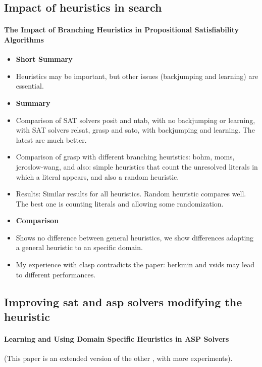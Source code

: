 \subsection{Impact of heuristics in search}	

\paragraph{The Impact of Branching Heuristics in Propositional Satisfiability Algorithms \cite{silva99a}}
\begin{itemize}
 \item \textbf{Short Summary}
  \item Heuristics may be important, but other issues (backjumping and learning) are essential.
 \item \textbf{Summary}
  \item Comparison of SAT solvers posit and ntab, with no backjumping or learning, 
        with SAT solvers relsat, grasp and sato, with backjumping and learning.
        The latest are much better.
  \item Comparison of grasp with different branching heuristics: 
        bohm, moms, jeroslow-wang, and also: simple heuristics that count the unresolved
        literals in which a literal appears, and also a random heuristic.
  \item Results: Similar results for all heuristics. Random heuristic compares well. 
        The best one is counting literals and allowing some randomization.
  \item \textbf{Comparison}
  \item Shows no difference between general heuristics, 
        we show differences adapting a general heuristic to an specific domain.
  \item My experience with clasp contradicts the paper: 
        berkmin and vsids may lead to different performances.      
        
\end{itemize} 

\subsection{Improving sat and asp solvers modifying the heuristic}	

\paragraph{Learning and Using Domain Specific Heuristics in ASP Solvers \cite{balduccini11b}}
(This paper is an extended version of the other \cite{balduccini10a}, with more experiments).

